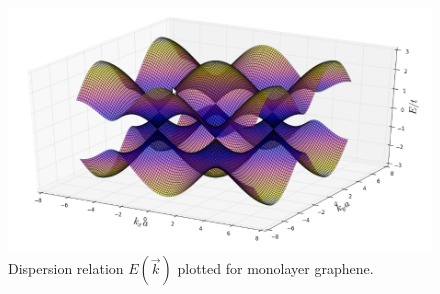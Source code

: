 \documentclass{article}
\begin{document}
\begin{figure}[h]
\centering
\includegraphics[scale=.42]{monolayer_disp_small}
\caption{Dispersion relation $E(\vec{k})$ plotted for monolayer graphene. }
\end{figure}
\end{document}
